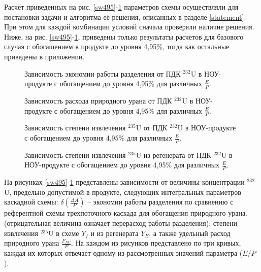 Расчёт приведенных на рис. \ref{sw495}-\ref{F0R495} параметров схемы осуществляли для постановки задачи и алгоритма её решения, описанных в разделе \ref{statement}. При этом для каждой комбинации условий сначала проверяли наличие решения. Ниже, на рис. \ref{sw495}-\ref{F0R495}, приведены только результаты расчетов для базового случая с обогащением в продукте до уровня 4,95\%, тогда как остальные приведены в приложении.


\begin{figure}[ht]
    \centering
    \begin{minipage}{.5\textwidth}
      \centering
      
\caption{{Зависимость экономии работы разделения от ПДК $^{232}$U в НОУ-продукте с обогащением до уровня 4,95\% для различных $\frac{E}{P}$.{\label{sw495}}}}
    \end{minipage}%
    \begin{minipage}{.5\textwidth}
      \centering
      
    \caption{{Зависимость расхода природного урана от ПДК $^{232}$U в НОУ-продукте с обогащением до уровня 4,95\% для различных $\frac{E}{P}$.{\label{F0R495}}}}
\end{minipage}
\end{figure}


\begin{figure}[ht]
    \centering
    \begin{minipage}{.5\textwidth}
      \centering
      
      \caption{{Зависимость степени извлечения $^{235}$U от ПДК $^{232}$U в НОУ-продукте с обогащением до уровня 4,95\% для различных $\frac{E}{P}$.{\label{ex495}}}}
    \end{minipage}%
    \begin{minipage}{.5\textwidth}
      \centering
      
      \caption{{Зависимость степени извлечения $^{235}$U из регенерата от ПДК $^{232}$U в НОУ-продукте с обогащением до уровня 4,95\% для различных $\frac{E}{P}$.{\label{exR495}}}}
\end{minipage}
\end{figure}


    
На рисунках \ref{sw495}-\ref{F0R495} представлены зависимости от величины концентрации $^{232}$U, предельно допустимой в продукте, следующих интегральных параметров каскадной схемы: $\delta(\frac{\Delta A}{P})$ -- экономии работы разделения по сравнению с референтной схемы трехпоточного каскада для обогащения природного урана.(отрицательная величина означает перерасход работы разделения); степени извлечения $^{235}$U в схеме $Y_f$ и из регенерата $Y_{E}$, а также удельный расход природного урана $\frac{F_{NU}}{P}$. На каждом из рисунков представлено по три кривых, каждая их которых отвечает одному из рассмотренных значений параметра ($E/P$).

